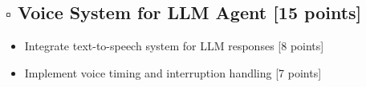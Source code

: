 \documentclass[12pt,letterpaper]{article}
\newcommand{\taskbox}{$\square$}
\begin{document}
\subsection{\taskbox \hspace{0.2cm} Voice System for LLM Agent \hfill {\color{successgreen}\bfseries [15 points]}}

\begin{itemize}[leftmargin=1cm, itemsep=0.3cm]
    \item[\taskbox] Integrate text-to-speech system for LLM responses \hfill {\small [8 points]}
    \item[\taskbox] Implement voice timing and interruption handling \hfill {\small [7 points]}
\end{itemize}

\vspace{1cm}
\end{document}
